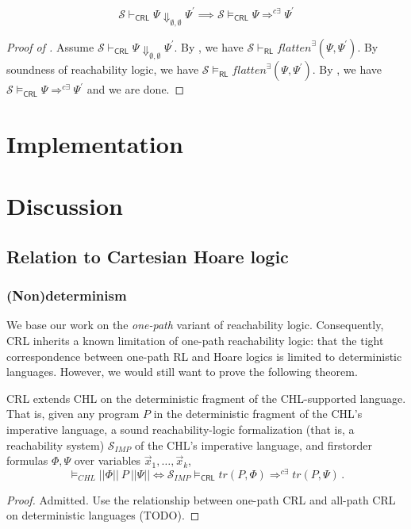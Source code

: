 \documentclass{article}
\newcommand{\RL}{\mathsf{RL}}
\newcommand{\CRL}{\mathsf{CRL}}
\begin{document}
\begin{theorem}\label{thm:proofsystemSoundness}
\begin{equation*}
    \mathcal{S} \vdash_\CRL \Psi \Downarrow_{\emptyset,\emptyset} \Psi^\prime \implies
    \mathcal{S} \vDash_{\CRL} \Psi \Rightarrow^{c\exists} \Psi^\prime
\end{equation*}
\end{theorem}
\begin{proof}[Proof of ]
Assume $\mathcal{S} \vdash_\CRL \Psi \Downarrow_{\emptyset,\emptyset} \Psi^\prime$.
By , we have $\mathcal{S} \vdash_\RL \mathit{flatten}^\exists(\Psi, \Psi^\prime)$.
By soundness of reachability logic, we have $\mathcal{S} \vDash_\RL \mathit{flatten}^\exists(\Psi, \Psi^\prime)$.
By , 
we have $\mathcal{S} \vDash_{\CRL} \Psi \Rightarrow^{c\exists} \Psi^\prime$ and we are done.
\end{proof}

\section{Implementation}

\section{Discussion}\label{sec:discussion}

\subsection{Relation to Cartesian Hoare logic}

\subsubsection{(Non)determinism}
We base our work on the \emph{one-path} variant of reachability logic.
Consequently, CRL inherits a known limitation of one-path reachability logic: that the tight correspondence between
one-path RL and Hoare logics is limited to deterministic languages.
However, we would still want to prove the following theorem.
\begin{theorem}
CRL extends CHL on the deterministic fragment of the CHL-supported language.
That is, given any program $P$ in the deterministic fragment of the CHL's imperative language,
a sound reachability-logic formalization (that is, a reachability system) $\mathcal{S}_{\mathit{IMP}}$ of the CHL's imperative language,
and firstorder formulas $\Phi, \Psi$ over variables $\vec{x}_1,\ldots,\vec{x}_k$,
\begin{equation*}
    \vDash_{\mathit{CHL}} ||\Phi||\ P\ ||\Psi||
    \iff
    \mathcal{S}_{\mathit{IMP}} \vDash_\CRL \mathit{tr}(P, \Phi) \Rightarrow^{c\exists} \mathit{tr}(P, \Psi) \, .
\end{equation*}
\end{theorem}
\begin{proof}
Admitted. Use the relationship between one-path CRL and all-path CRL on deterministic languages (TODO).
\end{proof}
\end{document}
